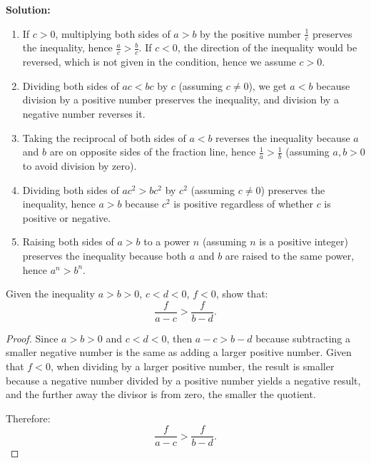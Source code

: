 \documentclass[
	12pt, %
	fleqn, %
	a4paper, %
]{LegrandOrangeBook}
\begin{document}
\textbf{Solution:}

\begin{enumerate}
    \item If \( c > 0 \), multiplying both sides of \( a > b \) by the positive number \( \frac{1}{c} \) preserves the inequality, hence \( \frac{a}{c} > \frac{b}{c} \). If \( c < 0 \), the direction of the inequality would be reversed, which is not given in the condition, hence we assume \( c > 0 \).
    \item Dividing both sides of \( ac < bc \) by \( c \) (assuming \( c \neq 0 \)), we get \( a < b \) because division by a positive number preserves the inequality, and division by a negative number reverses it.
    \item Taking the reciprocal of both sides of \( a < b \) reverses the inequality because \( a \) and \( b \) are on opposite sides of the fraction line, hence \( \frac{1}{a} > \frac{1}{b} \) (assuming \( a, b > 0 \) to avoid division by zero).
    \item Dividing both sides of \( ac^2 > bc^2 \) by \( c^2 \) (assuming \( c \neq 0 \)) preserves the inequality, hence \( a > b \) because \( c^2 \) is positive regardless of whether \( c \) is positive or negative.
    \item Raising both sides of \( a > b \) to a power \( n \) (assuming \( n \) is a positive integer) preserves the inequality because both \( a \) and \( b \) are raised to the same power, hence \( a^n > b^n \).
\end{enumerate}
\begin{exercise}
    Given the inequality \( a > b > 0 \), \( c < d < 0 \), \( f < 0 \), show that:
\[
\frac{f}{a - c} > \frac{f}{b - d}.
\]
\end{exercise}
\begin{proof}
    Since \( a > b > 0 \) and \( c < d < 0 \), then \( a - c > b - d \) because subtracting a smaller negative number is the same as adding a larger positive number. Given that \( f < 0 \), when dividing by a larger positive number, the result is smaller because a negative number divided by a positive number yields a negative result, and the further away the divisor is from zero, the smaller the quotient.

Therefore:
\[
\frac{f}{a - c} > \frac{f}{b - d}.
\]
\end{proof}



\chapterspaceabove{6.75cm} 
\chapterspacebelow{7.25cm} 
\end{document}
